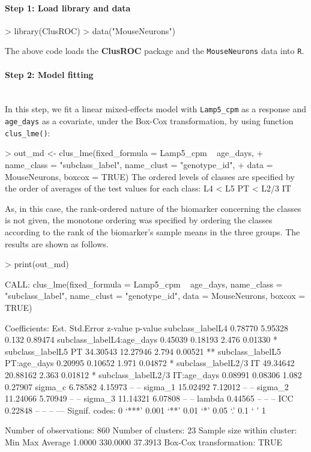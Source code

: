 \paragraph{Step 1: Load library and data}
\begin{example}
> library(ClusROC)
> data("MouseNeurons")
\end{example}
The above code loads the \textbf{ClusROC} package and the \texttt{MouseNeurons} data into \texttt{R}.

\paragraph{Step 2: Model fitting} \text{}\\
In this step, we fit a linear {mixed-effects} model with \texttt{Lamp5\_cpm} as a response and \texttt{age\_days} as a covariate, under the Box-Cox transformation, by using function \texttt{clus\_lme()}:

\begin{example}
> out_md <- clus_lme(fixed_formula = Lamp5_cpm ~ age_days, 
+                    name_class = "subclass_label", name_clust = "genotype_id", 
+                    data = MouseNeurons, boxcox = TRUE)
The ordered levels of classes are specified by the order of 
 averages of the test values for each class:
L4 < L5 PT < L2/3 IT 
\end{example}

\noindent
As, in this case, the rank-ordered nature of the biomarker concerning the classes is not given, the monotone ordering was specified by ordering the classes according to the rank of the biomarker's sample means in the three groups. The results are shown as follows.

\begin{example}
> print(out_md)

CALL: clus_lme(fixed_formula = Lamp5_cpm ~ age_days, name_class = "subclass_label", 
    name_clust = "genotype_id", data = MouseNeurons, boxcox = TRUE)
 
Coefficients:
                                   Est. Std.Error z-value p-value   
subclass_labelL4                0.78770   5.95328   0.132 0.89474   
subclass_labelL4:age_days       0.45039   0.18193   2.476 0.01330 * 
subclass_labelL5 PT            34.30543  12.27946   2.794 0.00521 **
subclass_labelL5 PT:age_days    0.20995   0.10652   1.971 0.04872 * 
subclass_labelL2/3 IT          49.34642  20.88162   2.363 0.01812 * 
subclass_labelL2/3 IT:age_days  0.08991   0.08306   1.082 0.27907   
sigma_c                         6.78582   4.15973      --      --   
sigma_1                        15.02492   7.12012      --      --   
sigma_2                        11.24066   5.70949      --      --   
sigma_3                        11.14321   6.07808      --      --
lambda                          0.44565        --      --      --   
ICC                             0.22848        --      --      --   
---
Signif. codes:  0 ‘***’ 0.001 ‘**’ 0.01 ‘*’ 0.05 ‘.’ 0.1 ‘ ’ 1

Number of observations: 860
Number of clusters: 23
Sample size within cluster:
     Min      Max  Average 
  1.0000 330.0000  37.3913 
Box-Cox transformation: TRUE
\end{example}

